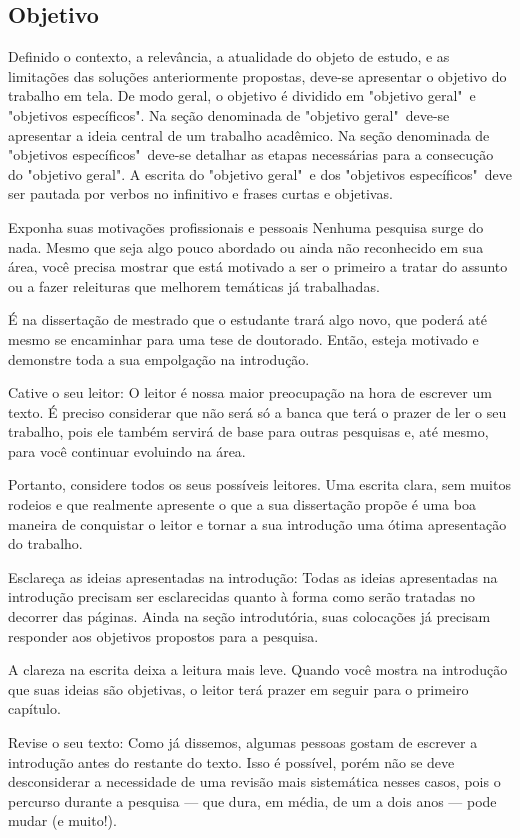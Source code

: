 \subsection{Objetivo}
Definido o contexto, a relevância, a atualidade do objeto de estudo, e as limitações das soluções anteriormente propostas, deve-se apresentar o objetivo do trabalho em tela. De modo geral, o objetivo é dividido em "objetivo geral"\ e "objetivos específicos". Na seção denominada de "objetivo geral"\ deve-se apresentar a ideia central de um trabalho acadêmico. Na seção denominada de "objetivos específicos"\ deve-se detalhar as etapas necessárias para a consecução do "objetivo geral". A escrita do "objetivo geral"\ e dos "objetivos específicos"\ deve ser pautada por verbos no infinitivo e frases curtas e objetivas.

Exponha suas motivações profissionais e pessoais
Nenhuma pesquisa surge do nada. Mesmo que seja algo pouco abordado ou ainda não reconhecido em sua área, você precisa mostrar que está motivado a ser o primeiro a tratar do assunto ou a fazer releituras que melhorem temáticas já trabalhadas.

É na dissertação de mestrado que o estudante trará algo novo, que poderá até mesmo se encaminhar para uma tese de doutorado. Então, esteja motivado e demonstre toda a sua empolgação na introdução.

Cative o seu leitor: O leitor é nossa maior preocupação na hora de escrever um texto. É preciso considerar que não será só a banca que terá o prazer de ler o seu trabalho, pois ele também servirá de base para outras pesquisas e, até mesmo, para você continuar evoluindo na área.

Portanto, considere todos os seus possíveis leitores. Uma escrita clara, sem muitos rodeios e que realmente apresente o que a sua dissertação propõe é uma boa maneira de conquistar o leitor e tornar a sua introdução uma ótima apresentação do trabalho.

Esclareça as ideias apresentadas na introdução: Todas as ideias apresentadas na introdução precisam ser esclarecidas quanto à forma como serão tratadas no decorrer das páginas. Ainda na seção introdutória, suas colocações já precisam responder aos objetivos propostos para a pesquisa.

A clareza na escrita deixa a leitura mais leve. Quando você mostra na introdução que suas ideias são objetivas, o leitor terá prazer em seguir para o primeiro capítulo.

Revise o seu texto: Como já dissemos, algumas pessoas gostam de escrever a introdução antes do restante do texto. Isso é possível, porém não se deve desconsiderar a necessidade de uma revisão mais sistemática nesses casos, pois o percurso durante a pesquisa — que dura, em média, de um a dois anos — pode mudar (e muito!).

